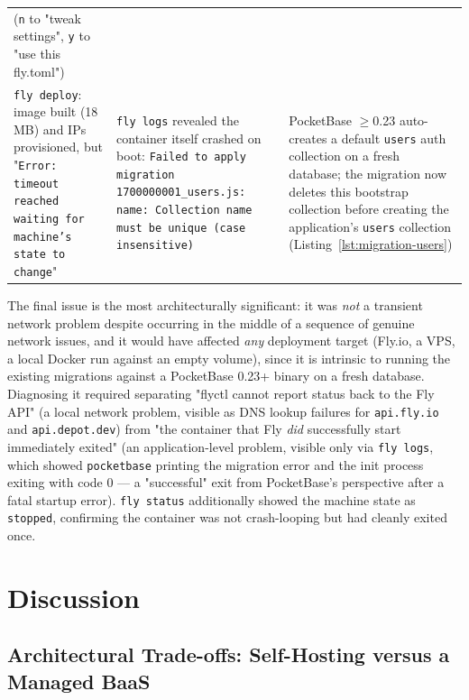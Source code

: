 \documentclass[11pt,a4paper]{article}
\begin{document}
\begin{table}[htbp]
\begin{tabular}{@{}p{3.4cm}p{4.3cm}p{4.6cm}@{}}
(\texttt{n} to "tweak settings", \texttt{y} to "use this fly.toml") \\
\addlinespace
\texttt{fly deploy}: image built (18\,MB) and IPs provisioned, but
"\texttt{Error: timeout reached waiting for machine's state to change}" &
\texttt{fly logs} revealed the container itself crashed on boot:
\texttt{Failed to apply migration 1700000001\_users.js: name: Collection
name must be unique (case insensitive)} &
PocketBase $\geq$0.23 auto-creates a default \texttt{users} auth collection on
a fresh database; the migration now deletes this bootstrap collection
before creating the application's \texttt{users} collection
(Listing~\ref{lst:migration-users}) \\
\bottomrule
\end{tabular}
\end{table}

The final issue is the most architecturally significant: it was \emph{not} a
transient network problem despite occurring in the middle of a sequence of
genuine network issues, and it would have affected \textit{any} deployment
target (Fly.io, a VPS, a local Docker run against an empty volume), since it
is intrinsic to running the existing migrations against a PocketBase 0.23+
binary on a fresh database. Diagnosing it required separating "flyctl cannot
report status back to the Fly API" (a local network problem, visible as DNS
lookup failures for \texttt{api.fly.io} and \texttt{api.depot.dev}) from "the
container that Fly \textit{did} successfully start immediately exited" (an
application-level problem, visible only via \texttt{fly logs}, which showed
\texttt{pocketbase} printing the migration error and the init process exiting
with code 0 --- a "successful" exit from PocketBase's perspective after a
fatal startup error). \texttt{fly status} additionally showed the machine
state as \texttt{stopped}, confirming the container was not crash-looping but
had cleanly exited once.


\section{Discussion}
\label{sec:discussion}

\subsection{Architectural Trade-offs: Self-Hosting versus a Managed BaaS}
\end{document}
